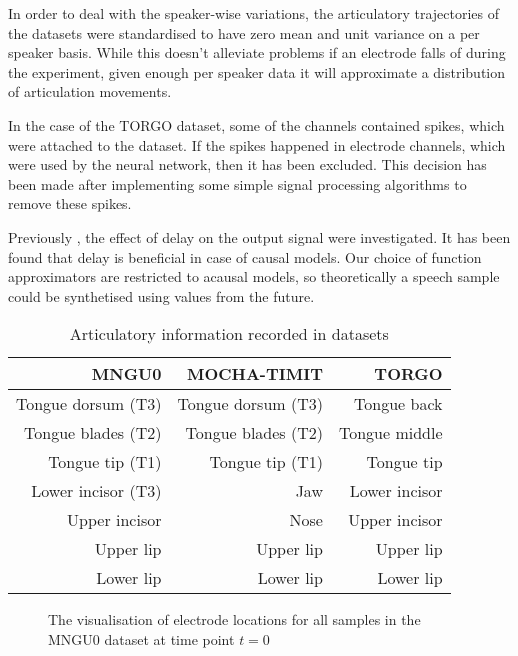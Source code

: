 \documentclass[a4paper]{article}
\begin{document}
In order to deal with the speaker-wise variations, the articulatory trajectories of
the datasets were standardised to have zero mean
and unit variance on a per speaker basis. While this doesn't alleviate problems if an electrode
falls of during the experiment, given enough per speaker data it will approximate a distribution
of articulation movements.

In the case of the TORGO dataset, some of the channels contained spikes, which
were attached to the dataset. If the spikes happened in electrode channels, which were used
by the neural network, then it has been excluded. This decision has been made after implementing
some simple signal processing algorithms to remove these spikes.

Previously \cite{Gonzalez2016}, the effect of delay on the
output signal were investigated. It has been found that delay
is beneficial in case of causal models. Our choice of function approximators are
restricted to acausal models, so theoretically a speech sample could be synthetised using
values from the future.

\begin{table}[th]
  \caption{Articulatory information recorded in datasets}
  \label{tab:electrodes}
  \centering
  \begin{tabular}{ r r r  }
    \toprule
    \textbf{MNGU0} & \textbf{MOCHA-TIMIT} & \textbf{TORGO} \\ 
    \midrule
    Tongue dorsum (T3) & Tongue dorsum (T3) & Tongue back \\
    Tongue blades (T2) & Tongue blades (T2) & Tongue middle \\
    Tongue tip (T1) & Tongue tip (T1) & Tongue tip \\
    Lower incisor (T3) & Jaw & Lower incisor\\
    Upper incisor & Nose & Upper incisor\\
    Upper lip & Upper lip & Upper lip \\
    Lower lip & Lower lip  & Lower lip\\
    \bottomrule
    \end{tabular}
\end{table}


\begin{figure}[t]
  \begin{center}
    \scalebox{0.50}{}
  \caption{The visualisation of electrode locations for all samples in
    the MNGU0 dataset at time point \( t = 0 \)}
\end{center}
\end{figure}
\end{document}
